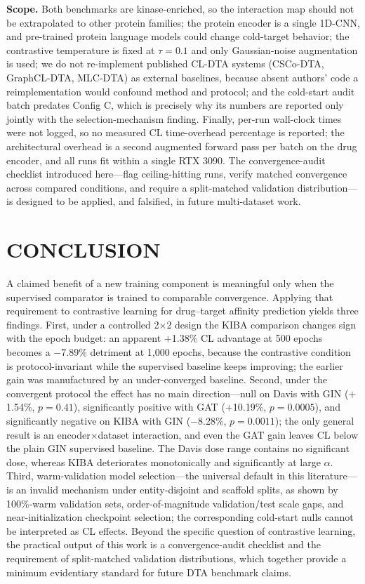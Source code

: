 \documentclass[10pt,a4paper,twocolumn]{article}
\begin{document}
\textbf{Scope.} Both benchmarks are kinase-enriched, so the interaction map should not be extrapolated to other protein families; the protein encoder is a single 1D-CNN, and pre-trained protein language models could change cold-target behavior; the contrastive temperature is fixed at $\tau=0.1$ and only Gaussian-noise augmentation is used; we do not re-implement published CL-DTA systems (CSCo-DTA, GraphCL-DTA, MLC-DTA) as external baselines, because absent authors' code a reimplementation would confound method and protocol; and the cold-start audit batch predates Config C, which is precisely why its numbers are reported only jointly with the selection-mechanism finding. Finally, per-run wall-clock times were not logged, so no measured CL time-overhead percentage is reported; the architectural overhead is a second augmented forward pass per batch on the drug encoder, and all runs fit within a single RTX 3090. The convergence-audit checklist introduced here---flag ceiling-hitting runs, verify matched convergence across compared conditions, and require a split-matched validation distribution---is designed to be applied, and falsified, in future multi-dataset work.

\section{CONCLUSION}

A claimed benefit of a new training component is meaningful only when the supervised comparator is trained to comparable convergence. Applying that requirement to contrastive learning for drug--target affinity prediction yields three findings. First, under a controlled 2$\times$2 design the KIBA comparison changes sign with the epoch budget: an apparent $+$1.38\% CL advantage at 500 epochs becomes a $-$7.89\% detriment at 1{,}000 epochs, because the contrastive condition is protocol-invariant while the supervised baseline keeps improving; the earlier gain was manufactured by an under-converged baseline. Second, under the convergent protocol the effect has no main direction---null on Davis with GIN ($+$1.54\%, $p=0.41$), significantly positive with GAT ($+$10.19\%, $p=0.0005$), and significantly negative on KIBA with GIN ($-$8.28\%, $p=0.0011$); the only general result is an encoder$\times$dataset interaction, and even the GAT gain leaves CL below the plain GIN supervised baseline. The Davis dose range contains no significant dose, whereas KIBA deteriorates monotonically and significantly at large $\alpha$. Third, warm-validation model selection---the universal default in this literature---is an invalid mechanism under entity-disjoint and scaffold splits, as shown by 100\%-warm validation sets, order-of-magnitude validation/test scale gaps, and near-initialization checkpoint selection; the corresponding cold-start nulls cannot be interpreted as CL effects. Beyond the specific question of contrastive learning, the practical output of this work is a convergence-audit checklist and the requirement of split-matched validation distributions, which together provide a minimum evidentiary standard for future DTA benchmark claims.
\end{document}
